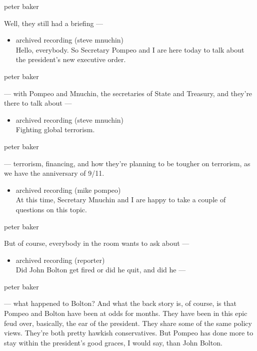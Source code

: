 peter baker

Well, they still had a briefing ---

\begin{itemize}
\tightlist
\item
  archived recording (steve mnuchin)\\
  Hello, everybody. So Secretary Pompeo and I are here today to talk
  about the president's new executive order.
\end{itemize}

peter baker

--- with Pompeo and Mnuchin, the secretaries of State and Treasury, and
they're there to talk about ---

\begin{itemize}
\tightlist
\item
  archived recording (steve mnuchin)\\
  Fighting global terrorism.
\end{itemize}

peter baker

--- terrorism, financing, and how they're planning to be tougher on
terrorism, as we have the anniversary of 9/11.

\begin{itemize}
\tightlist
\item
  archived recording (mike pompeo)\\
  At this time, Secretary Mnuchin and I are happy to take a couple of
  questions on this topic.
\end{itemize}

peter baker

But of course, everybody in the room wants to ask about ---

\begin{itemize}
\tightlist
\item
  archived recording (reporter)\\
  Did John Bolton get fired or did he quit, and did he ---
\end{itemize}

peter baker

--- what happened to Bolton? And what the back story is, of course, is
that Pompeo and Bolton have been at odds for months. They have been in
this epic feud over, basically, the ear of the president. They share
some of the same policy views. They're both pretty hawkish
conservatives. But Pompeo has done more to stay within the president's
good graces, I would say, than John Bolton.

